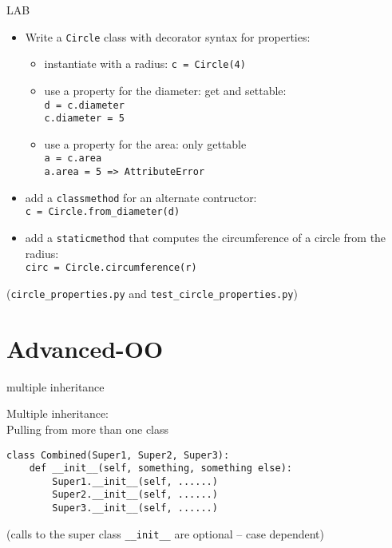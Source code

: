 \documentclass{beamer}
\begin{document}
\begin{frame}[fragile]{LAB}

\begin{itemize}
  \item Write a \verb|Circle| class with decorator syntax for properties:
  \begin{itemize}
  \item instantiate with a radius: \verb|c = Circle(4)|
  \item use a property for the diameter: get and settable:\\
        \verb|d = c.diameter| \\
        \verb|c.diameter = 5|
  \item use a property for the area: only gettable\\
        \verb|a = c.area| \\
        \verb|a.area = 5 => AttributeError|
  \end{itemize}
  
  \item add a \verb|classmethod| for an alternate contructor:\\
     \verb|c = Circle.from_diameter(d)|

  \item add a \verb|staticmethod| that computes the circumference of a circle from the radius:\\
     \verb|circ = Circle.circumference(r)|


\end{itemize}


\vfill
(\verb|circle_properties.py| and \verb|test_circle_properties.py|)

\end{frame}


\section{Advanced-OO}

\begin{frame}[fragile]{multiple inheritance}

{\Large Multiple inheritance:\\
\hspace{0.2in} Pulling from more than one class}

\vfill
\begin{verbatim}
class Combined(Super1, Super2, Super3):
    def __init__(self, something, something else):
        Super1.__init__(self, ......)        
        Super2.__init__(self, ......)        
        Super3.__init__(self, ......)        
\end{verbatim}
(calls to the super class \verb|__init__| are optional -- case dependent)

\end{frame} 
\end{document}

